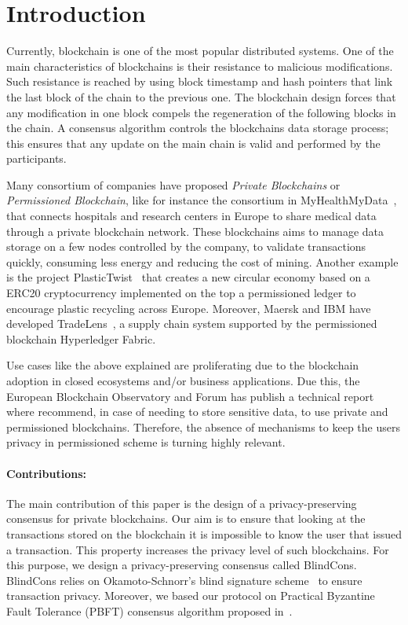 \documentclass[conference]{IEEEtran}
\newcommand{\name}{BlindCons}
\begin{document}
\section{Introduction} \label{intro}

Currently, blockchain is one of the most popular distributed systems. One of the main characteristics of blockchains is their resistance to malicious modifications. Such resistance is reached by using block timestamp and hash pointers that link the last block of the chain to the previous one. The blockchain design forces that any modification in one block compels the regeneration of the following blocks in the chain. A consensus algorithm controls the blockchains data storage process; this ensures that any update on the main chain is valid and performed by the participants.

Many consortium of companies have proposed  \emph{Private Blockchains} or \emph{Permissioned Blockchain}, like for instance the consortium in MyHealthMyData~\cite{MHMD}, that connects hospitals and research centers in Europe to share medical data through a private blockchain network. These blockchains aims to manage data storage on a few nodes controlled by the company, to validate transactions quickly, consuming less energy and  reducing the cost of mining. Another example is the project PlasticTwist~\cite{PTWIST} that creates a new circular economy based on a  ERC20 cryptocurrency implemented on the top a permissioned ledger to encourage plastic recycling across Europe. Moreover, Maersk and IBM have developed TradeLens~\cite{Tradelens}, a supply chain system supported by the permissioned blockchain Hyperledger Fabric.  

Use cases like the above explained are proliferating due to the blockchain adoption in closed ecosystems and/or business applications. Due this, the European Blockchain Observatory  and Forum has publish a technical report~\cite{BlockchainGDPR} where recommend, in case of needing to store sensitive data, to use private and permissioned blockchains. Therefore, the absence of mechanisms to keep the users privacy in permissioned scheme is turning highly relevant.

\paragraph*{Contributions:} The main contribution of this paper is the design of a privacy-preserving consensus for private blockchains. Our aim is to ensure that looking at the transactions stored on the blockchain it is impossible to know the user that issued a transaction. This property increases the privacy  level of such blockchains. For this purpose, we design a privacy-preserving consensus called \name{}. \name{} relies on Okamoto-Schnorr's blind signature scheme~\cite{okamoto1992provably} to ensure transaction privacy. Moreover, we based our protocol on Practical Byzantine Fault Tolerance (PBFT) consensus algorithm proposed in~\cite{castro1999practical}.
\end{document}
